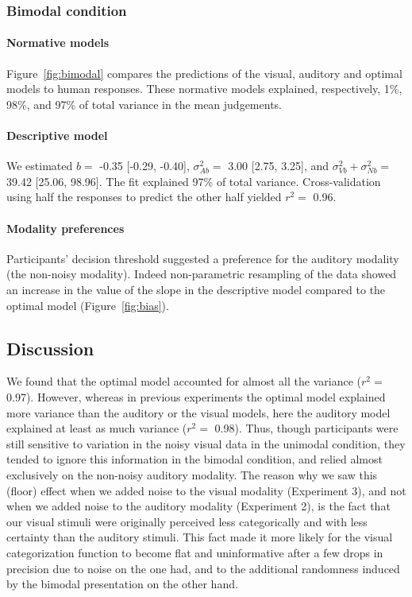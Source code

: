 \documentclass[english,floatsintext,man]{apa6}
\theoremstyle{definition}
\theoremstyle{definition}
\theoremstyle{definition}
\theoremstyle{remark}
\begin{document}
\subsubsection{Bimodal condition}\label{bimodal-condition-3}

\paragraph{Normative models}\label{normative-models-2}

Figure~\ref{fig:bimodal} compares the predictions of the visual,
auditory and optimal models to human responses. These normative models
explained, respectively, 1\%, 98\%, and 97\% of total variance in the
mean judgements.

\paragraph{Descriptive model}\label{descriptive-model-2}

We estimated \(b=\) -0.35 {[}-0.29, -0.40{]}, \(\sigma^2_{Ab}=\) 3.00
{[}2.75, 3.25{]}, and \(\sigma^2_{Vb}+\sigma^2_{Nb}=\) 39.42 {[}25.06,
98.96{]}. The fit explained 97\% of total variance. Cross-validation
using half the responses to predict the other half yielded \(r^2=\)
0.96.

\paragraph{Modality preferences}\label{modality-preferences-1}

Participants' decision threshold suggested a preference for the auditory
modality (the non-noisy modality). Indeed non-parametric resampling of
the data showed an increase in the value of the slope in the descriptive
model compared to the optimal model (Figure~\ref{fig:bias}).

\subsection{Discussion}\label{discussion-2}

We found that the optimal model accounted for almost all the variance
(\(r^2 =\) 0.97). However, whereas in previous experiments the optimal
model explained more variance than the auditory or the visual models,
here the auditory model explained at least as much variance (\(r^2 =\)
0.98). Thus, though participants were still sensitive to variation in
the noisy visual data in the unimodal condition, they tended to ignore
this information in the bimodal condition, and relied almost exclusively
on the non-noisy auditory modality. The reason why we saw this (floor)
effect when we added noise to the visual modality (Experiment 3), and
not when we added noise to the auditory modality (Experiment 2), is the
fact that our visual stimuli were originally perceived less
categorically and with less certainty than the auditory stimuli. This
fact made it more likely for the visual categorization function to
become flat and uninformative after a few drops in precision due to
noise on the one had, and to the additional randomness induced by the
bimodal presentation on the other hand.
\end{document}
